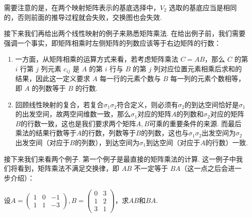 \begin{enumerate}
          需要注意的是，在两个映射矩阵表示的基底选择中，$V_2$ 选取的基底应当是相同的，否则前面的推导过程就会失败，交换图也会失效.
\end{enumerate}

接下来我们再给出两个线性映射的例子来熟悉矩阵乘法. 在给出例子前，我们需要强调一个事实，即矩阵相乘时左侧矩阵的列数应该等于右边矩阵的行数：
\begin{enumerate}
    \item 一方面，从矩阵相乘的运算方式来看，若考虑矩阵乘法 $C = AB$，那么 $C$ 的第 $i$ 行第 $j$ 列元素 $c_{ij}$ 是 $A$ 的第 $i$ 行与 $B$ 的第 $j$ 列对应位置元素相乘后求和的结果，因此这一定义要求 $A$ 每一行的元素个数与 $B$ 每一列的元素个数相等，即 $A$ 的列数等于 $B$ 的行数.
    \item 回顾线性映射的复合，若复合$\sigma_1\sigma_2$符合定义，则必须有$\sigma_2$的到达空间恰好是$\sigma_1$的出发空间，故两空间维数一致，那么$\sigma_1$对应的矩阵$A$的列数和$\sigma_2$对应的矩阵$B$的行数一致，这也是我们要求两个矩阵$A,B$可乘的重要条件的来源. 而最后乘法的结果行数等于$A$的行数，列数等于$B$的列数，这也与$\sigma_1\sigma_2$出发空间为$\sigma_2$出发空间（对应于$B$的列数），到达空间为$\sigma_1$到达空间（对应于$A$的行数）一致.
\end{enumerate}

接下来我们来看两个例子. 第一个例子是最直接的矩阵乘法的计算. 这一例子中我们将看到，矩阵乘法不满足交换律，即 $AB$ 不一定等于 $BA$（这一点之后会进一步介绍）：
\begin{example}{}{}
    设$A=\begin{pmatrix}
            1 & 0 & -1 \\
            1 & 1 & -3
        \end{pmatrix}, B=\begin{pmatrix}
            0 & 3 \\
            1 & 2 \\
            3 & 1
        \end{pmatrix}$，求$AB$和$BA$.
\end{example}

